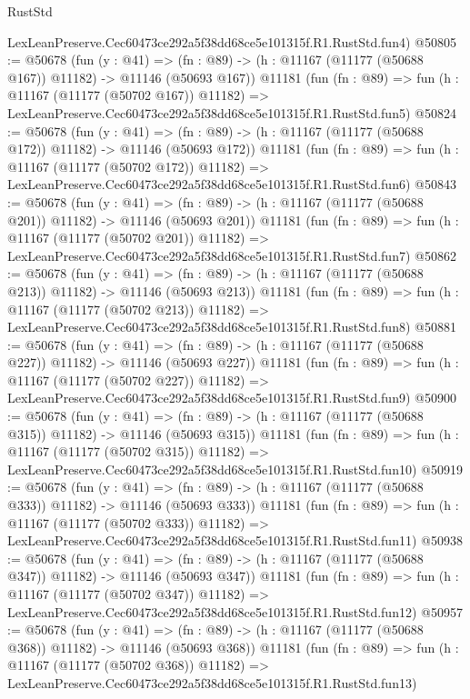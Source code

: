 \begin{lexlean}{RustStd}
\begin{coremodule}
    LexLeanPreserve.Cec60473ce292a5f38dd68ce5e101315f.R1.RustStd.fun4)
@50805 := @50678
    (fun (y : @41) =>
    (fn : @89) -> (h : @11167 (@11177 (@50688 @167)) @11182) -> @11146 (@50693 @167))
    @11181
    (fun (fn : @89) =>
    fun (h : @11167 (@11177 (@50702 @167)) @11182) =>
    LexLeanPreserve.Cec60473ce292a5f38dd68ce5e101315f.R1.RustStd.fun5)
@50824 := @50678
    (fun (y : @41) =>
    (fn : @89) -> (h : @11167 (@11177 (@50688 @172)) @11182) -> @11146 (@50693 @172))
    @11181
    (fun (fn : @89) =>
    fun (h : @11167 (@11177 (@50702 @172)) @11182) =>
    LexLeanPreserve.Cec60473ce292a5f38dd68ce5e101315f.R1.RustStd.fun6)
@50843 := @50678
    (fun (y : @41) =>
    (fn : @89) -> (h : @11167 (@11177 (@50688 @201)) @11182) -> @11146 (@50693 @201))
    @11181
    (fun (fn : @89) =>
    fun (h : @11167 (@11177 (@50702 @201)) @11182) =>
    LexLeanPreserve.Cec60473ce292a5f38dd68ce5e101315f.R1.RustStd.fun7)
@50862 := @50678
    (fun (y : @41) =>
    (fn : @89) -> (h : @11167 (@11177 (@50688 @213)) @11182) -> @11146 (@50693 @213))
    @11181
    (fun (fn : @89) =>
    fun (h : @11167 (@11177 (@50702 @213)) @11182) =>
    LexLeanPreserve.Cec60473ce292a5f38dd68ce5e101315f.R1.RustStd.fun8)
@50881 := @50678
    (fun (y : @41) =>
    (fn : @89) -> (h : @11167 (@11177 (@50688 @227)) @11182) -> @11146 (@50693 @227))
    @11181
    (fun (fn : @89) =>
    fun (h : @11167 (@11177 (@50702 @227)) @11182) =>
    LexLeanPreserve.Cec60473ce292a5f38dd68ce5e101315f.R1.RustStd.fun9)
@50900 := @50678
    (fun (y : @41) =>
    (fn : @89) -> (h : @11167 (@11177 (@50688 @315)) @11182) -> @11146 (@50693 @315))
    @11181
    (fun (fn : @89) =>
    fun (h : @11167 (@11177 (@50702 @315)) @11182) =>
    LexLeanPreserve.Cec60473ce292a5f38dd68ce5e101315f.R1.RustStd.fun10)
@50919 := @50678
    (fun (y : @41) =>
    (fn : @89) -> (h : @11167 (@11177 (@50688 @333)) @11182) -> @11146 (@50693 @333))
    @11181
    (fun (fn : @89) =>
    fun (h : @11167 (@11177 (@50702 @333)) @11182) =>
    LexLeanPreserve.Cec60473ce292a5f38dd68ce5e101315f.R1.RustStd.fun11)
@50938 := @50678
    (fun (y : @41) =>
    (fn : @89) -> (h : @11167 (@11177 (@50688 @347)) @11182) -> @11146 (@50693 @347))
    @11181
    (fun (fn : @89) =>
    fun (h : @11167 (@11177 (@50702 @347)) @11182) =>
    LexLeanPreserve.Cec60473ce292a5f38dd68ce5e101315f.R1.RustStd.fun12)
@50957 := @50678
    (fun (y : @41) =>
    (fn : @89) -> (h : @11167 (@11177 (@50688 @368)) @11182) -> @11146 (@50693 @368))
    @11181
    (fun (fn : @89) =>
    fun (h : @11167 (@11177 (@50702 @368)) @11182) =>
    LexLeanPreserve.Cec60473ce292a5f38dd68ce5e101315f.R1.RustStd.fun13)

\end{coremodule}
\end{lexlean}
